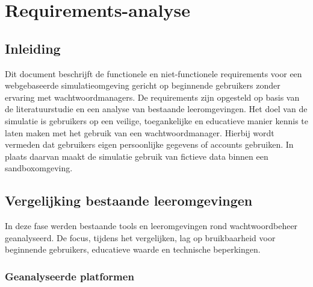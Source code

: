 
\chapter{Requirements-analyse}
\label{ch:requirements}

\section{Inleiding}

Dit document beschrijft de functionele en niet-functionele requirements voor een webgebaseerde simulatieomgeving gericht op beginnende gebruikers zonder ervaring met wachtwoordmanagers. De requirements zijn opgesteld op basis van de literatuurstudie en een analyse van bestaande leeromgevingen.
Het doel van de simulatie is gebruikers op een veilige, toegankelijke en educatieve manier kennis te laten maken met het gebruik van een wachtwoordmanager. Hierbij wordt vermeden dat gebruikers eigen persoonlijke gegevens of accounts gebruiken. In plaats daarvan maakt de simulatie gebruik van fictieve data binnen een sandboxomgeving.

\section{Vergelijking bestaande leeromgevingen}

In deze fase werden bestaande tools en leeromgevingen rond wachtwoordbeheer geanalyseerd. De focus, tijdens het vergelijken, lag op bruikbaarheid voor beginnende gebruikers, educatieve waarde en technische beperkingen.

\subsection{Geanalyseerde platformen}




